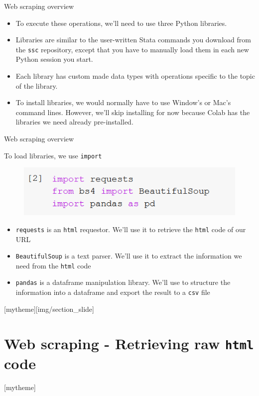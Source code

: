 \documentclass[aspectratio=169]{beamer}
\newcommand{\sectionpic}[2]{
	\setbeamertemplate{section page}[mytheme][#2]
	\section{#1}
	\setbeamertemplate{section page}[mytheme]
}
\begin{document}
\begin{frame}{Web scraping overview}

	\begin{itemize}	
		\item To execute these operations, we'll need to use three Python libraries.
		\item Libraries are similar to the user-written Stata commands you download from the \texttt{ssc} repository, except that you have to manually load them in each new Python session you start.
		\item Each library has custom made data types with operations specific to the topic of the library.
		\item To install libraries, we would normally have to use Window's or Mac's command lines. However, we'll skip installing for now because Colab has the libraries we need already pre-installed.
	\end{itemize}

\end{frame}

\begin{frame}{Web scraping overview}

	To load libraries, we use \texttt{import}

	\begin{figure}
		\centering
		\includegraphics[width=0.4\linewidth]{img/libraries.png}
	\end{figure}

	\begin{itemize}
		\item \texttt{requests} is an \texttt{html} requestor. We'll use it to retrieve the \texttt{html} code of our URL
		\item \texttt{BeautifulSoup} is a text parser. We'll use it to extract the information we need from the \texttt{html} code
		\item \texttt{pandas} is a dataframe manipulation library. We'll use to structure the information into a dataframe and export the result to a \texttt{csv} file
	\end{itemize}

\end{frame}

\sectionpic{Web scraping - Retrieving raw \texttt{html} code}{img/section_slide}
\end{document}
